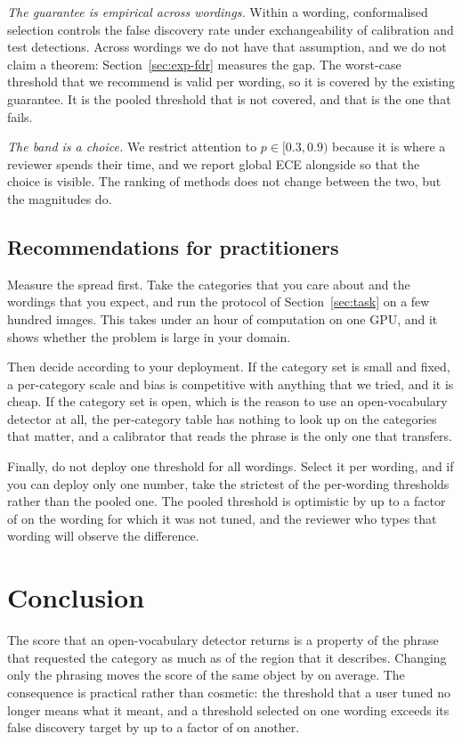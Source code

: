 \emph{The guarantee is empirical across wordings.} Within a wording, conformalised selection
controls the false discovery rate under exchangeability of calibration and test detections. Across
wordings we do not have that assumption, and we do not claim a theorem:
Section~\ref{sec:exp-fdr} measures the gap. The worst-case threshold that we recommend is valid per
wording, so it is covered by the existing guarantee. It is the pooled threshold that is not
covered, and that is the one that fails.

\emph{The band is a choice.} We restrict attention to $p\in[0.3,0.9)$ because it is where a
reviewer spends their time, and we report global ECE alongside so that the choice is visible. The
ranking of methods does not change between the two, but the magnitudes do.

\subsection{Recommendations for practitioners}

Measure the spread first. Take the categories that you care about and the wordings that you
expect, and run the protocol of Section~\ref{sec:task} on a few hundred images. This takes under an
hour of computation on one GPU, and it shows whether the problem is large in your domain.

Then decide according to your deployment. If the category set is small and fixed, a per-category
scale and bias is competitive with anything that we tried, and it is cheap. If the category set is
open, which is the reason to use an open-vocabulary detector at all, the per-category table has
nothing to look up on the categories that matter, and a calibrator that reads the phrase is the
only one that transfers.

Finally, do not deploy one threshold for all wordings. Select it per wording, and if you can
deploy only one number, take the strictest of the per-wording thresholds rather than the pooled
one. The pooled threshold is optimistic by up to a factor of \FDROVERSHOOT{} on the wording for
which it was not tuned, and the reviewer who types that wording will observe the difference.

\section{Conclusion}

The score that an open-vocabulary detector returns is a property of the phrase that requested the
category as much as of the region that it describes. Changing only the phrasing moves the score of
the same object by \SPREADPTS{} on average. The consequence is practical rather than cosmetic: the
threshold that a user tuned no longer means what it meant, and a threshold selected on one wording
exceeds its false discovery target by up to a factor of \FDROVERSHOOT{} on another.

